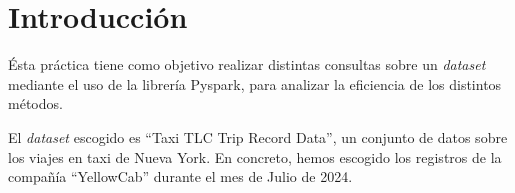 \section{Introducción}
Ésta práctica tiene como objetivo realizar distintas consultas sobre un \textit{dataset} mediante el uso de la librería Pyspark, para analizar la eficiencia de los distintos métodos.

El \textit{dataset} escogido es ``Taxi TLC Trip Record Data'', un conjunto de datos sobre los viajes en taxi de Nueva York. En concreto, hemos escogido los registros de la compañía ``YellowCab'' durante el mes de Julio de 2024.
